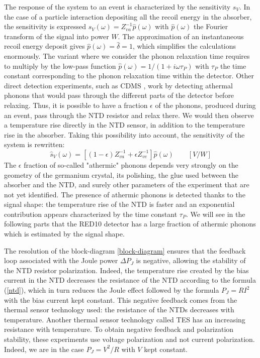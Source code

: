 The response of the system to an event is characterized by the sensitivity $s_V$. In the case of a particle interaction depositing all the recoil energy in the absorber, the sensitivity is expressed ${s}_V(\omega) = Z_{va}^{-1}\hat{p}(\omega)$ with $\hat{p}(\omega)$ the Fourier transform of the signal into power $W$. The approximation of an instantaneous recoil energy deposit gives $\hat{p}(\omega) = \hat{\delta} = 1$, which simplifies the calculations enormously. The variant where we consider the phonon relaxation time requires to multiply by the low-pass function $\hat{p}(\omega) = 1/(1+i\omega \tau_P)$ with $\tau_P$ the time constant corresponding to the phonon relaxation time within the detector. Other direct detection experiments, such as CDMS \cite{julian}, work by detecting athermal phonons that would pass through the different parts of the detector before relaxing. Thus, it is possible to have a fraction $\epsilon$ of the phonons, produced during an event, pass through the NTD resistor and relax there. We would then observe a temperature rise directly in the NTD sensor, in addition to the temperature rise in the absorber. Taking this possibility into account, the sensitivity of the system is rewritten:
\begin{equation}
\label{sv}
\hat{s}_V(\omega) = \left[(1-\epsilon) Z_{va}^{-1} + \epsilon Z_{ve}^{-1}\right]\hat{p}(\omega) \qquad [V/W]
\end{equation}
The $\epsilon$ fraction of so-called "athermic" phonons depends very strongly on the geometry of the germanium crystal, its polishing, the glue used between the absorber and the NTD, and surely other parameters of the experiment that are not yet identified. The presence of athermic phonons is detected thanks to the signal shape: the temperature rise of the NTD is faster and an exponential contribution appears characterized by the time constant $\tau_P$. We will see in the following parts that the RED10 detector has a large fraction of athermic phonons which is estimated by the signal shape.

The resolution of the block-diagram \ref{block-diagram} ensures that the feedback loop associated with the Joule power $\Delta P_J$ is negative, allowing the stability of the NTD resistor polarization. Indeed, the temperature rise created by the bias current in the NTD decreases the resistance of the NTD according to the formula (\ref{ntd}), which in turn reduces the Joule effect followed by the formula $P_J=RI^2$ with the bias current kept constant. This negative feedback comes from the thermal sensor technology used: the resistance of the NTDs decreases with temperature. Another thermal sensor technology called TES \cite{julien} \cite{matrix} has an increasing resistance with temperature. To obtain negative feedback and polarization stability, these experiments use voltage polarization and not current polarization. Indeed, we are in the case $P_J=V^2/R$ with $V$ kept constant.

